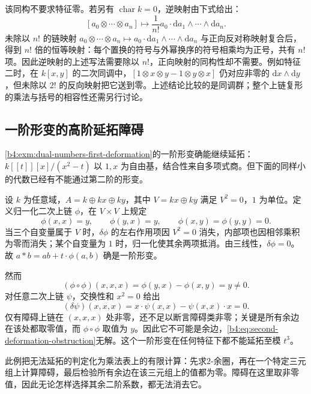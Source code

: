 该同构不要求特征零。若另有 \(\operatorname{char}k=0\)，逆映射由下式给出：
\[
	[a_0\otimes\cdots\otimes a_n]\longmapsto \dfrac{1}{n!}a_0\cdot\mathrm{d}a_1\wedge\cdots\wedge \mathrm{d}a_n.
\]
未除以 \(n!\) 的链映射 \(a_0\otimes\cdots\otimes a_n\mapsto a_0\cdot\mathrm{d}a_1\wedge\cdots\wedge\mathrm{d}a_n\) 与正向反对称映射复合后，得到 \(n!\) 倍的恒等映射：每个置换的符号与外幂换序的符号相乘均为正号，共有 \(n!\) 项。因此逆映射的上述写法需要除以 \(n!\)，正向映射的同构性却不需要。例如特征二时，在 \(k[x,y]\) 的二次同调中，\([1\otimes x\otimes y-1\otimes y\otimes x]\) 仍对应非零的 \(\mathrm{d}x\wedge\mathrm{d}y\)，但未除以 \(2!\) 的反向映射把它送到零。上述结论比较的是同调群；整个上链复形的乘法与括号的相容性还需另行讨论。

\subsection{一阶形变的高阶延拓障碍}
\label{b4:subsec:1204:03}

\cref{b4:exm:dual-numbers-first-deformation}的一阶形变确能继续延拓：\(k[\![t]\!][x]/(x^2-t)\) 以 \(1,x\) 为自由基，结合性来自多项式商。但下面的同样小的代数已经有不能通过第二阶的形变。

\begin{example}\label{b4:exm:obstructed-deformation}
	设 \(k\) 为任意域，\(A=k\oplus kx\oplus ky\)，其中 \(V=kx\oplus ky\) 满足 \(V^2=0\)，\(1\) 为单位。定义归一化二次上链 \(\phi\)，在 \(V\times V\) 上规定
	\[
		\phi(x,x)=y,\qquad \phi(y,x)=y,\qquad \phi(x,y)=\phi(y,y)=0.
	\]
	当三个自变量属于 \(V\) 时，\(\delta\phi\) 的左右作用项因 \(V^2=0\) 消失，内部项也因相邻乘积为零而消失；某个自变量为 \(1\) 时，归一化使其余两项抵消。由三线性，\(\delta\phi=0\)。故 \(a*b=ab+t\cdot\phi(a,b)\) 确是一阶形变。

	\ProseParagraphBreak
	然而
	\[
		(\phi\circ\phi)(x,x,x) =\phi(y,x)-\phi(x,y)=y\ne0.
	\]
	对任意二次上链 \(\psi\)，交换性和 \(x^2=0\) 给出
	\[
		(\delta\psi)(x,x,x) =x\cdot\psi(x,x)-\psi(x,x)\cdot x=0.
	\]
	仅有障碍上链在 \((x,x,x)\) 处非零，还不足以断言障碍类非零；关键是所有余边在该处都取零值，而 \(\phi\circ\phi\) 取值为 \(y\)。因此它不可能是余边，\eqref{b4:eq:second-deformation-obstruction}无解。这个一阶形变在任何特征下都不能延拓至模 \(t^3\)。
\end{example}

此例把无法延拓的判定化为乘法表上的有限计算：先求\(2\)-余圈，再在一个特定三元组上计算障碍，最后检验所有余边在该三元组上的值都为零。障碍在这里取非零值，因此无论怎样选择其余二阶系数，都无法消去它。

